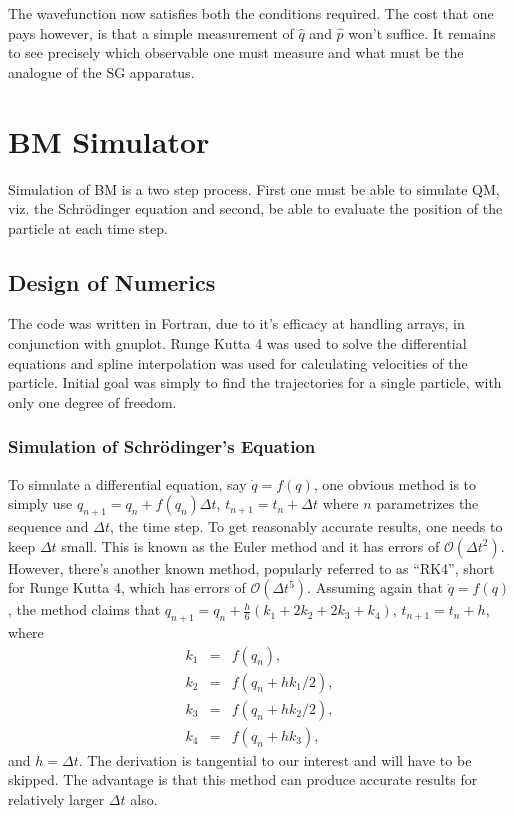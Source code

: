 The wavefunction now satisfies both the conditions required. The cost
that one pays however, is that a simple measurement of $\hat{q}$
and $\hat{p}$ won't suffice. It remains to see precisely which observable
one must measure and what must be the analogue of the SG apparatus.


\section{BM Simulator \label{sec:BM-Simulator}}

Simulation of BM is a two step process. First one must be able to
simulate QM, viz. the Schr\"odinger equation and second, be able
to evaluate the position of the particle at each time step. 


\subsection{Design of Numerics}

The code was written in Fortran, due to it's efficacy at handling
arrays, in conjunction with gnuplot. Runge Kutta 4 was used to solve
the differential equations and spline interpolation was used for calculating
velocities of the particle. Initial goal was simply to find the trajectories
for a single particle, with only one degree of freedom.


\subsubsection{Simulation of Schr\"odinger's Equation}

To simulate a differential equation, say $\dot{q}=f(q)$, one obvious
method is to simply use $q_{n+1}=q_{n}+f(q_{n})\Delta t$, $t_{n+1}=t_{n}+\Delta t$
where $n$ parametrizes the sequence and $\Delta t$, the time step.
To get reasonably accurate results, one needs to keep $\Delta t$
small. This is known as the Euler method and it has errors of $\mathcal{O}(\Delta t^{2})$.
However, there's another known method, popularly referred to as ``RK4'',
short for Runge Kutta 4, which has errors of $\mathcal{O}(\Delta t^{5})$.
Assuming again that $\dot{q}=f(q)$, the method claims that $q_{n+1}=q_{n}+\frac{h}{6}(k_{1}+2k_{2}+2k_{3}+k_{4})$,
$t_{n+1}=t_{n}+h$, where 
\begin{eqnarray*}
k_{1} & = & f(q_{n}),\\
k_{2} & = & f(q_{n}+hk_{1}/2),\\
k_{3} & = & f(q_{n}+hk_{2}/2),\\
k_{4} & = & f(q_{n}+hk_{3}),
\end{eqnarray*}
and $h=\Delta t$. The derivation is tangential to our interest and
will have to be skipped. The advantage is that this method can produce
accurate results for relatively larger $\Delta t$ also. 

